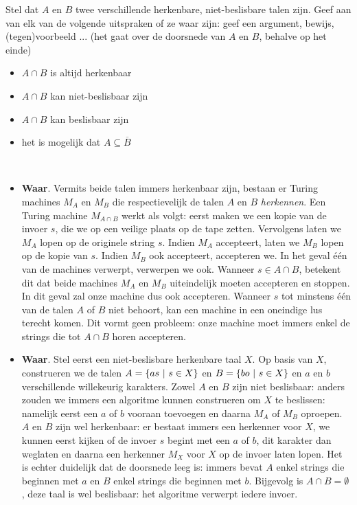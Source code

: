 \documentclass{article}
\begin{document}
\begin{question}[Beslisbaarheid]
Stel dat $A$ en $B$ twee verschillende herkenbare, niet-beslisbare talen zijn.
Geef aan van elk van de volgende uitspraken of ze waar zijn: geef een
argument, bewijs, (tegen)voorbeeld ... (het gaat over de doorsnede van $A$ en
$B$, behalve op het einde)
\begin{itemize}
\item $A \cap B$ is altijd herkenbaar
\item $A \cap B$ kan niet-beslisbaar zijn
\item $A \cap B$ kan beslisbaar zijn
\item het is mogelijk dat $A \subseteq \overline{B}$
\end{itemize}
\begin{answer}
~~
\begin{itemize}
 \item \textbf{Waar}. Vermits beide talen immers herkenbaar zijn, bestaan er Turing machines
 $M_A$ en $M_B$ die respectievelijk de talen $A$ en $B$ \emph{herkennen}. Een Turing
 machine $M_{A\cap B}$ werkt als volgt: eerst maken we een kopie van de invoer $s$, die we op
 een veilige plaats op de tape zetten.
 Vervolgens laten we $M_A$ lopen op de originele string $s$. Indien $M_A$ accepteert,
 laten we $M_B$ lopen op de kopie van $s$. Indien $M_B$ ook accepteert, accepteren we. In het
 geval \'e\'en van de machines verwerpt, verwerpen we ook. Wanneer $s\in A\cap B$, betekent dit dat
 beide machines $M_A$ en $M_B$ uiteindelijk moeten accepteren en stoppen. In dit geval zal onze machine
 dus ook accepteren. Wanneer $s$ tot minstens \'e\'en van de talen $A$ of $B$ niet behoort, kan een
 machine in een oneindige lus terecht komen. Dit vormt geen probleem: onze machine moet immers
 enkel de strings die tot $A\cap B$ horen accepteren.
 \item \textbf{Waar}. Stel eerst een niet-beslisbare herkenbare taal $X$. Op basis van $X$, construeren we de talen $A=\left\{ as\ |\ s\in X \right\}$ en $B=\left\{ bo\ |\ s\in X \right\}$ en $a$ en $b$ verschillende willekeurig karakters. Zowel $A$ en $B$ zijn niet beslisbaar: anders zouden we immers een algoritme kunnen construeren om $X$ te beslissen: namelijk eerst een $a$ of $b$ vooraan toevoegen en daarna $M_A$ of $M_B$ oproepen. $A$ en $B$ zijn wel herkenbaar: er bestaat immers een herkenner voor $X$, we kunnen eerst kijken of de invoer $s$ begint met een $a$ of $b$, dit karakter dan weglaten en daarna een herkenner $M_X$ voor $X$ op de invoer laten lopen. Het is echter duidelijk dat de doorsnede leeg is: immers bevat $A$ enkel strings die beginnen met $a$ en $B$ enkel strings die beginnen met $b$. Bijgevolg is $A\cap B=\emptyset$, deze taal is wel beslisbaar: het algoritme verwerpt iedere invoer.

\end{itemize}
\end{answer}
\end{question}
\end{document}
